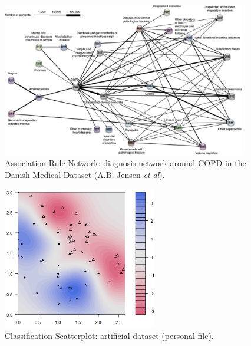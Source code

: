 \afterpage{\FloatBarrier}
\vfill
\newpage
\vfill
\begin{figure}[t]
\centering
\includegraphics[width=0.95\textwidth]{Images/COPD.png}
\caption[\small Association Rule Network: Danish Medical Dataset ]{\small Association Rule Network: diagnosis network around COPD in the Danish Medical Dataset (A.B. Jensen \textit{et al}).} \label{fig:ex_arn_copd}
\end{figure}
\afterpage{\FloatBarrier}
\vfill
\begin{figure}[t]
\centering
\includegraphics[width=0.6\textwidth]{Images/fig9.png}
\caption[\small Classification Scatterplot: artificial dataset ]{\small Classification Scatterplot: artificial dataset (personal file).} \label{fig:ex_cs_SVM}
\end{figure}
\afterpage{\FloatBarrier}
\vfill
\newpage
\vfill
